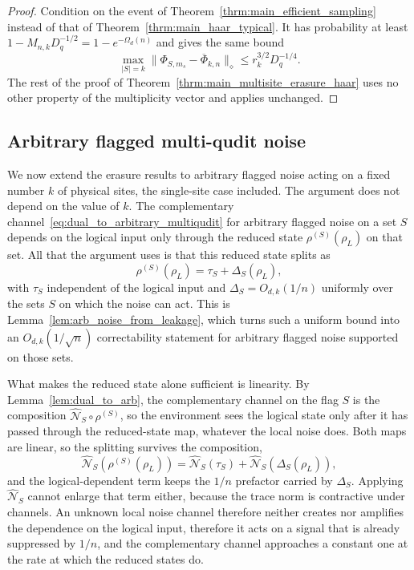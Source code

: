 \documentclass[10pt,twocolumn,superscriptaddress,aps,amsmath,amssymb,citeautoscript,floatfix,prx]{revtex4-2}
\theoremstyle{plain}
\theoremstyle{plain}
\theoremstyle{plain}
\theoremstyle{plain}
\theoremstyle{plain}
\theoremstyle{plain}
\theoremstyle{plain}
\theoremstyle{definition}
\theoremstyle{plain}
\begin{document}
\begin{proof}
Condition on the event of Theorem~\ref{thrm:main_efficient_sampling} instead of that of Theorem~\ref{thrm:main_haar_typical}. 
It has probability at least $1-M_{n,k}D_q^{-1/2}=1-e^{-\Omega_d(n)}$ and gives the same bound
$$
\max_{|S|=k}\|\Phi_{S,m_s}-\overline\Phi_{k,n}\|_\diamond
\le
r_k^{3/2}D_q^{-1/4}.
$$
The rest of the proof of Theorem~\ref{thrm:main_multisite_erasure_haar} uses no other property of the multiplicity vector and applies unchanged.
\end{proof}

\subsection{Arbitrary flagged multi-qudit noise}\label{subsec:main_arb_3_noise}

We now extend the erasure results to arbitrary flagged noise acting on a fixed number $k$ of physical sites, the single-site case included. 
The argument does not depend on the value of $k$. The complementary channel~\eqref{eq:dual_to_arbitrary_multiqudit} 
for arbitrary flagged noise on a set $S$ depends on the logical input only through the reduced state $\rho^{(S)}(\rho_L)$ on that set. 
All that the argument uses is that this reduced state splits as
$$
\rho^{(S)}(\rho_L)
=
\tau_S
+
\Delta_S(\rho_L),
$$
with $\tau_S$ independent of the logical input and $\Delta_S=O_{d,k}(1/n)$ uniformly over the sets $S$ on which the noise can act. 
This is Lemma~\ref{lem:arb_noise_from_leakage}, which turns such a uniform bound into an $O_{d,k}(1/\sqrt n)$ correctability statement for arbitrary 
flagged noise supported on those sets.

What makes the reduced state alone sufficient is linearity. By Lemma~\ref{lem:dual_to_arb}, the complementary channel on the flag $S$ is the composition $\widehat{\mathcal N}_S\circ\rho^{(S)}$, 
so the environment sees the logical state only after it has passed through the reduced-state map, whatever the local noise does. 
Both maps are linear, so the splitting survives the composition,
$$
\widehat{\mathcal N}_S\left(\rho^{(S)}(\rho_L)\right)
=
\widehat{\mathcal N}_S(\tau_S)
+
\widehat{\mathcal N}_S\left(\Delta_S(\rho_L)\right),
$$
and the logical-dependent term keeps the $1/n$ prefactor carried by $\Delta_S$. 
Applying $\widehat{\mathcal N}_S$ cannot enlarge that term either, because the trace norm is contractive under channels. 
An unknown local noise channel therefore neither creates nor amplifies the dependence on the logical input, 
therefore it acts on a signal that is already suppressed by $1/n$, and the complementary channel approaches a constant one at the rate at which 
the reduced states do.
\end{document}
